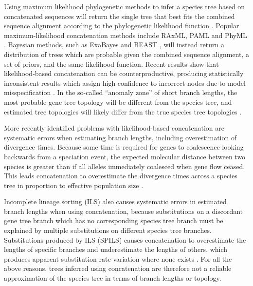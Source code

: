 \documentclass[nogrid]{MBE}%
\begin{document}
Using maximum likelihood phylogenetic methods to infer a species tree based on concatenated
sequences will return the single tree that
best fits the combined sequence alignment according to the phylogenetic likelihood function \citep{Felsenstein1981}. Popular maximum-likelihood concatenation methods include
RAxML, PAML and PhyML \citep{Stamatakis01052014,
Yang01082007,Guindon01052010}. Bayesian methods, such as ExaBayes and BEAST
\citep{Aberer01102014, Drummond2007}, will instead return a distribution of trees which are probable
given the combined sequence alignment, a set of priors, and the same likelihood function.
Recent results show that likelihood-based concatenation
can be counterproductive, producing statistically inconsistent results which assign
high confidence to incorrect nodes due to model misspecification
\citep{NYAS:NYAS12747}. In the so-called ``anomaly zone'' of short branch
lengths, the most probable gene tree topology will be different from the species
tree, and estimated tree topologies will likely differ from the true species
tree topologies \citep{journal.pgen.0020068, Kubatko01022007}.

More recently identified problems with likelihood-based concatenation are
systematic errors when estimating branch lengths, including overestimation of
divergence times. Because some time is required for genes to coalescence
looking backwards from a speciation event, the expected molecular distance
between two species is greater than if all alleles immediately coalesced when
gene flow ceased. This leads concatenation to overestimate the divergence
times across a species tree in proportion to effective population size
\citep{doi:10.1146/annurev.ecolsys.33.010802.150500, Ogilvie01052016}.

Incomplete lineage sorting (ILS) also causes systematic errors in estimated
branch lengths when using concatenation, because substitutions on a discordant gene tree branch
which has no corresponding species tree branch must be explained by multiple
substitutions on different species tree branches. Substitutions
produced by ILS (SPILS) causes concatenation to overestimate the lengths of specific
branches and underestimate the lengths of others, which produces apparent
substitution rate variation where none exists \citep{Mendes01072016}. For all
the above reasons, trees
inferred using concatenation are therefore not a reliable approximation of the
species tree in terms of branch lengths or topology.
\end{document}
